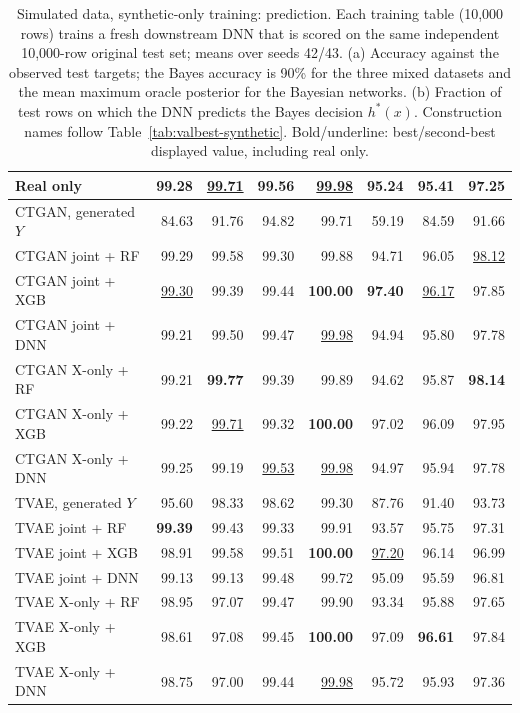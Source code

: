 \begin{table}[p]
\begin{tabular}{@{}lrrrrrrr@{}}
\addlinespace[2pt]
Real only & 99.28 & \underline{99.71} & \textbf{99.56} & \underline{99.98} & 95.24 & 95.41 & 97.25 \\
\midrule
CTGAN, generated $Y$ & 84.63 & 91.76 & 94.82 & 99.71 & 59.19 & 84.59 & 91.66 \\
CTGAN joint + RF & 99.29 & 99.58 & 99.30 & 99.88 & 94.71 & 96.05 & \underline{98.12} \\
CTGAN joint + XGB & \underline{99.30} & 99.39 & 99.44 & \textbf{100.00} & \textbf{97.40} & \underline{96.17} & 97.85 \\
CTGAN joint + DNN & 99.21 & 99.50 & 99.47 & \underline{99.98} & 94.94 & 95.80 & 97.78 \\
CTGAN X-only + RF & 99.21 & \textbf{99.77} & 99.39 & 99.89 & 94.62 & 95.87 & \textbf{98.14} \\
CTGAN X-only + XGB & 99.22 & \underline{99.71} & 99.32 & \textbf{100.00} & 97.02 & 96.09 & 97.95 \\
CTGAN X-only + DNN & 99.25 & 99.19 & \underline{99.53} & \underline{99.98} & 94.97 & 95.94 & 97.78 \\
\addlinespace
TVAE, generated $Y$ & 95.60 & 98.33 & 98.62 & 99.30 & 87.76 & 91.40 & 93.73 \\
TVAE joint + RF & \textbf{99.39} & 99.43 & 99.33 & 99.91 & 93.57 & 95.75 & 97.31 \\
TVAE joint + XGB & 98.91 & 99.58 & 99.51 & \textbf{100.00} & \underline{97.20} & 96.14 & 96.99 \\
TVAE joint + DNN & 99.13 & 99.13 & 99.48 & 99.72 & 95.09 & 95.59 & 96.81 \\
TVAE X-only + RF & 98.95 & 97.07 & 99.47 & 99.90 & 93.34 & 95.88 & 97.65 \\
TVAE X-only + XGB & 98.61 & 97.08 & 99.45 & \textbf{100.00} & 97.09 & \textbf{96.61} & 97.84 \\
TVAE X-only + DNN & 98.75 & 97.00 & 99.44 & \underline{99.98} & 95.72 & 95.93 & 97.36 \\
\bottomrule
\end{tabular}
\caption{Simulated data, synthetic-only training: prediction. Each training table (10,000 rows) trains a fresh downstream DNN that is scored on the same independent 10,000-row original test set; means over seeds 42/43. (a) Accuracy against the observed test targets; the Bayes accuracy is 90\% for the three mixed datasets and the mean maximum oracle posterior for the Bayesian networks. (b) Fraction of test rows on which the DNN predicts the Bayes decision $h^*(x)$. Construction names follow Table~\ref{tab:valbest-synthetic}. Bold/underline: best/second-best displayed value, including real only.}
\label{tab:sim-prediction}
\end{table}
